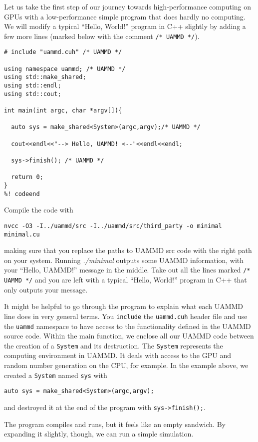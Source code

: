 Let us take the first step of our journey towards high-performance computing on
GPUs with a low-performance simple program that does hardly no computing. We
will modify a typical ``Hello, World!'' program in C++ slightly by adding a few
more lines (marked below with the comment \texttt{/* UAMMD */}).
\begin{lstlisting}[frame=single]
%! codefile: ../code/minimal.cu
# include "uammd.cuh" /* UAMMD */

using namespace uammd; /* UAMMD */
using std::make_shared;
using std::endl;
using std::cout;

int main(int argc, char *argv[]){

  auto sys = make_shared<System>(argc,argv);/* UAMMD */

  cout<<endl<<"--> Hello, UAMMD! <--"<<endl<<endl;

  sys->finish(); /* UAMMD */

  return 0;
}
%! codeend
\end{lstlisting}
Compile the code with
\begin{verbatim}
nvcc -O3 -I../uammd/src -I../uammd/src/third_party -o minimal
minimal.cu
\end{verbatim}
making sure that you replace the paths to UAMMD src code with the right path on
your system. Running \textit{./minimal} outputs some UAMMD information, with
your ``Hello, UAMMD!'' message in the middle. Take out all the lines marked
\texttt{/* UAMMD */} and you are left with a typical ``Hello, World!'' program
in C++ that only outputs your message.

It might be helpful to go through the program to explain what each UAMMD line 
does in very general terms. You \texttt{include} the \texttt{uammd.cuh} header 
file and use the \texttt{uammd} namespace to have access to the functionality 
defined in the UAMMD source code. Within the main function, we enclose all our 
UAMMD code between the creation of a \texttt{System} and its destruction. The
\texttt{System} represents the computing environment in UAMMD. It deals with
access to the GPU and random number generation on the CPU, for example. In the
example above, we created a \texttt{System} named \texttt{sys} with
\begin{verbatim}
auto sys = make_shared<System>(argc,argv);
\end{verbatim}
and destroyed it at the end of the program with \texttt{sys->finish();}.

The program compiles and runs, but it feels like an empty sandwich. By expanding
it slightly, though, we can run a simple simulation.

